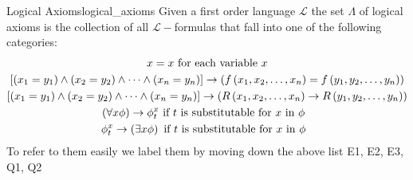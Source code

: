 \begin{definition}{Logical Axioms}{logical_axioms}
 Given a first order language $ \mathcal{ L }   $ the set $\Lambda$ of logical axioms is the collection of all $ \mathcal{ L }-$formulas that fall into one of the following categories:
\begin{gather*}
    x=x  \text { for each variable } x \\
    \left[\left(x_{1}=y_{1}\right) \wedge\left(x_{2}=y_{2}\right) \wedge \cdots \wedge\left(x_{n}=y_{n}\right)\right] \rightarrow \left(f\left(x_{1}, x_{2}, \ldots, x_{n}\right)=f\left(y_{1}, y_{2}, \ldots, y_{n}\right)\right) \\
    \left[\left(x_{1}=y_{1}\right) \wedge\left(x_{2}=y_{2}\right) \wedge \cdots \wedge\left(x_{n}=y_{n}\right)\right] \rightarrow \left(R\left(x_{1}, x_{2}, \ldots, x_{n}\right) \rightarrow R\left(y_{1}, y_{2}, \ldots, y_{n}\right)\right)\\
    \left( \forall x \phi  \right) \rightarrow \phi _{ t }^{ x } ~\text{if $ t $ is substitutable for $ x $ in $ \phi  $ }~  \\
    \phi _{ t }^{ x } \to \left( \exists x \phi \right) ~\text{if $ t $ is substitutable for $ x $ in $ \phi  $ }~  
\end{gather*}
To refer to them easily we label them by  moving down the above list E1, E2, E3, Q1, Q2 
\end{definition}
